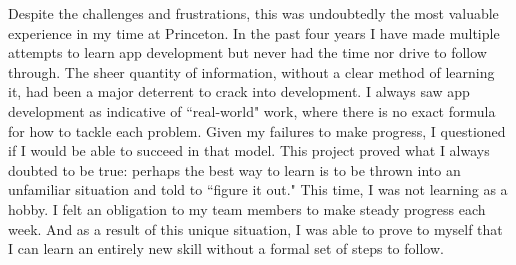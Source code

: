 \documentclass[12pt]{article}
\begin{document}
Despite the challenges and frustrations, this was undoubtedly the most valuable experience in my time at Princeton. In the past four years I have made multiple attempts to learn app development but never had the time nor drive to follow through. The sheer quantity of information, without a clear method of learning it, had been a major deterrent to crack into development. I always saw app development as indicative of ``real-world" work, where there is no exact formula for how to tackle each problem. Given my failures to make progress, I questioned if I would be able to succeed in that model. This project proved what I always doubted to be true: perhaps the best way to learn is to be thrown into an unfamiliar situation and told to ``figure it out." This time, I was not learning as a hobby. I felt an obligation to my team members to make steady progress each week. And as a result of this unique situation, I was able to prove to myself that I can learn an entirely new skill without a formal set of steps to follow. 
\end{document}
